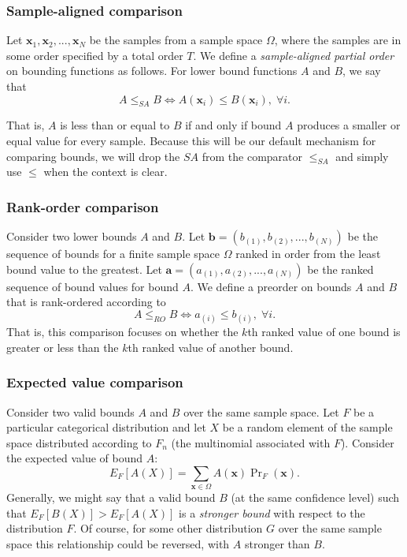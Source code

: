 \documentclass{article}
\theoremstyle{definition}
\theoremstyle{remark}
\def\a{\mathbf{a}}
\def\b{\mathbf{b}}
\def\x{\mathbf{x}}
\def\b{\mathbf{b}}
\begin{document}
\subsubsection{Sample-aligned comparison}
Let $\x_1,\x_2,...,\x_N$ be the samples from a sample space $\Omega$, where the samples are in some order specified by a total order $T$. We define a {\em sample-aligned partial order} on bounding functions as follows. For lower bound functions $A$ and $B$, we say that
$$
A\leq_{SA} B \iff A(\x_i) \leq B(\x_i),\; \forall i.$$

That is, $A$ is less than or equal to $B$ if and only if bound $A$ produces a smaller or equal value for every sample. 
Because this will be our default mechanism for comparing bounds, we will drop the $SA$ from the comparator $\leq_{SA}$ and simply use $\leq$ when the context is clear.

\subsubsection{Rank-order comparison}
Consider two lower bounds $A$ and $B$. Let $\b=(b_{(1)},b_{(2)}, ..., b_{(N)})$ be the sequence of bounds for a finite sample space $\Omega$ ranked in order from the least bound value to the greatest. Let $\a=(a_{(1)},a_{(2)}, ..., a_{(N)})$ be the ranked sequence of bound values for bound $A$.  We define a preorder on bounds $A$ and $B$ that is rank-ordered according to 
$$
A \leq_{RO} B \iff a_{(i)} \leq b_{(i)}, \; \forall i.
$$
That is, this comparison focuses on whether the $k$th ranked value of one bound is greater or less than the $k$th ranked value of another bound. 

\subsubsection{Expected value comparison}
Consider two valid bounds $A$ and $B$ over the same sample space. Let $F$ be a particular categorical distribution and let $X$ be a random element of the sample space distributed according to $F_n$ (the multinomial associated with $F$). Consider the expected value of  bound $A$:
$$
E_F[A(X)]=\sum_{\x\in \Omega} A(\x) \Pr\nolimits_F(\x).
$$
Generally, we might say that a valid bound $B$ (at the same confidence level) such that $E_F[B(X)]>E_F[A(X)]$ is a {\em stronger bound} with respect to the distribution $F$.  Of course, for some other distribution $G$ over the same sample space this relationship could be reversed, with $A$ stronger than $B$. 
\end{document}
